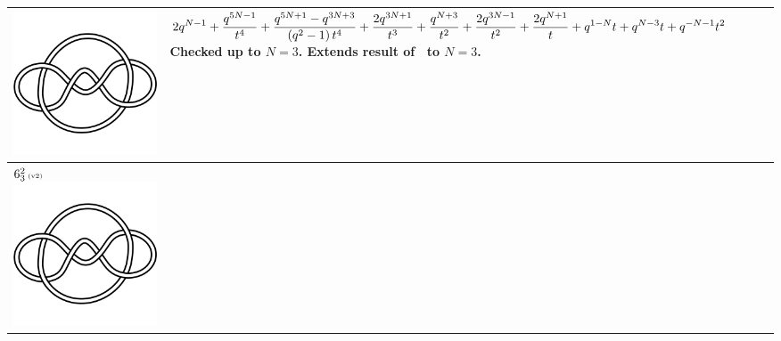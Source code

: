 \documentclass{compositio}
\theoremstyle{definition}
\numberwithin{equation}{section}
\begin{document}
{\begin{longtable}{p{}|p{}}
\includegraphics[scale=0.07,angle=0]{link6_3_2.pdf} 
& 
$
\displaystyle{%
2 q^{N-1}+\frac{q^{5 N-1}}{t^4}+\frac{q^{5 N+1}-q^{3 N+3}}{\left(q^2-1\right) t^4}+\frac{2 q^{3 N+1}}{t^3}+\frac{q^{N+3}}{t^2}+\frac{2 q^{3 N-1}}{t^2}+\frac{2 q^{N+1}}{t}+q^{1-N} t+q^{N-3} t+q^{-N-1} t^2
}
$
\newline\newline\newline\newline
Checked up to $N=3$. Extends result of~\cite{r0508510} to $N=3$. 
\\
\hline
$6_{3}^2\,\text{{\tiny (v2)}}$ 
\includegraphics[scale=0.07,angle=0]{link6_3_2.pdf} 

\end{longtable}}
\end{document}
